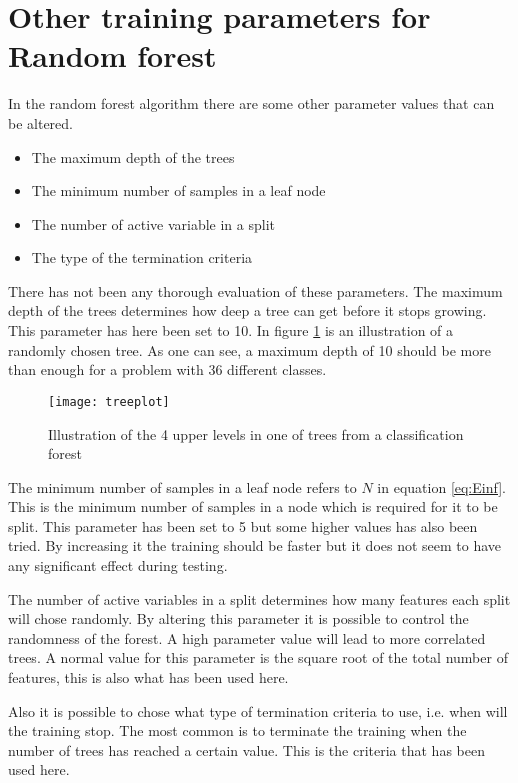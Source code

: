 \section{Other training parameters for Random forest}
\label{sec:Other training parameters for Random forest}
In the random forest algorithm there are some other parameter values that can be altered.
\begin{center}
\begin{itemize}
	\item The maximum depth of the trees
	\item The minimum number of samples in a leaf node
	\item The number of active variable in a split
	\item The type of the termination criteria
\end{itemize}
\end{center}
There has not been any thorough evaluation of these parameters. The maximum depth of the trees determines how deep a tree can get before it stops growing. This parameter has here been set to 10. In figure \ref{treeplot} is an illustration of a randomly chosen tree. As one can see, a maximum depth of 10 should be more than enough for a problem with 36 different classes.

\begin{figure}[H]
\centering
	\texttt{[image: treeplot]}
	\caption{Illustration of the 4 upper levels in one of trees from a classification forest}
	\label{treeplot}
\end{figure}

The minimum number of samples in a leaf node refers to $N$ in equation  \ref{eq:Einf}. This is the minimum number of samples in a node which is required for it to be split. This parameter has been set to 5 but some higher values has also been tried. By increasing it the training should be faster but it does not seem to have any significant effect during testing.

The number of active variables in a split determines how many features each split will chose randomly. By altering this parameter it is possible to control the randomness of the forest. A high parameter value will lead to more correlated trees. A normal value for this parameter is the square root of the total number of features, this is also what has been used here.

Also it is possible to chose what type of termination criteria to use, i.e. when will the training stop. The most common is to terminate the training when the number of trees has reached a certain value. This is the criteria that has been used here.

